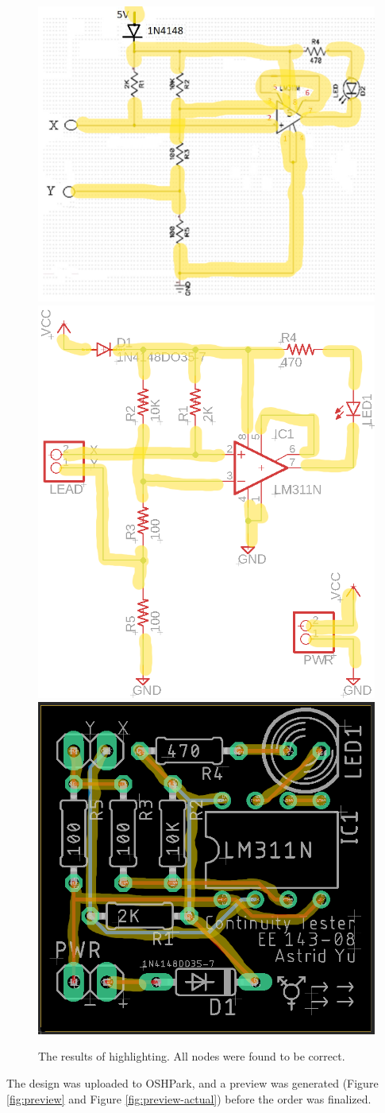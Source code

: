 \documentclass[12pt]{article}
\begin{document}
\begin{enumerate}[a)]
        \begin{figure}[H]
            \centering
            \includegraphics[width=0.3\linewidth]{ctestsch-anno.png}
            \includegraphics[width=0.3\linewidth]{sch-anno.png}
            \includegraphics[width=0.3\linewidth]{pcb-anno.png}
            \caption{The results of highlighting. All nodes were found to be correct.}
            \label{fig:highlight}
        \end{figure}

        The design was uploaded to OSHPark, and a preview was generated (Figure \ref{fig:preview} and Figure \ref{fig:preview-actual})
        before the order was finalized.
        

\end{enumerate}
\end{document}
